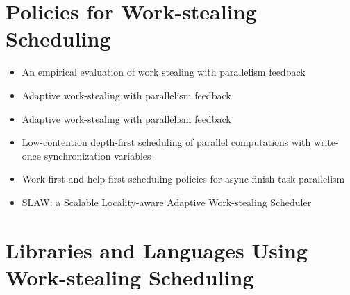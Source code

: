 \section{Policies for Work-stealing Scheduling}
\label{sec:lr-policies-for-work-stealing-scheduling}

\begin{itemize}
\item An empirical evaluation of work stealing with parallelism
  feedback \cite{Agrawal2006}
\item Adaptive work-stealing with parallelism feedback
  \cite{Agrawal2008}
\item Adaptive work-stealing with parallelism feedback
  \cite{Agrawal2008a}
\item Low-contention depth-first scheduling of parallel computations
  with write-once synchronization variables \cite{Fatourou2001}
\item Work-first and help-first scheduling policies for async-finish
  task parallelism \cite{Guo2009}
\item SLAW: a Scalable Locality-aware Adaptive Work-stealing Scheduler
  \cite{Guo2010}
\end{itemize}


\section{Libraries and Languages Using Work-stealing Scheduling}
\label{sec:lr-libaries-and-languages-using-work-stealing-scheduling}

